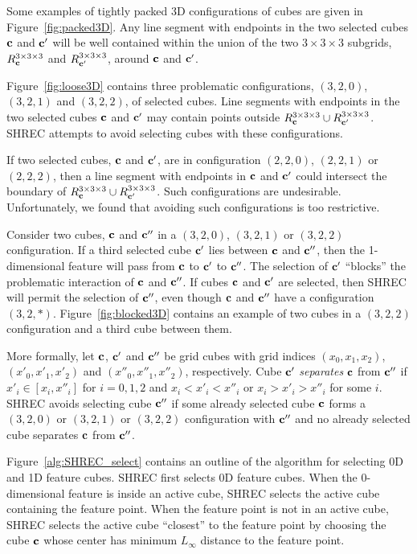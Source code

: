 Some examples of tightly packed 3D configurations of cubes are given
in Figure~\ref{fig:packed3D}.
Any line segment with endpoints in the two selected cubes $\mathbf{c}$ and $\mathbf{c}'$
will be well contained within the union 
of the two $3 \times 3 \times 3$ subgrids, 
$R^{3 \times 3 \times 3}_{\mathbf{c}}$ and $R^{3 \times 3 \times 3}_{\mathbf{c}'}$, around $\mathbf{c}$ and $\mathbf{c}'$.

Figure~\ref{fig:loose3D} contains three problematic configurations,
$(3,2,0)$, $(3,2,1)$ and $(3,2,2)$,
of  selected cubes.
Line segments with endpoints in the two selected cubes $\mathbf{c}$ and $\mathbf{c}'$
may contain points outside $R^{3 \times 3 \times 3}_{\mathbf{c}} \cup R^{3 \times 3 \times 3}_{\mathbf{c}'}$.
SHREC attempts to avoid selecting cubes with these configurations.

If two selected cubes, $\mathbf{c}$ and $\mathbf{c}'$, 
are in configuration $(2,2,0)$, $(2,2,1)$ or $(2,2,2)$,
then a line segment with endpoints in $\mathbf{c}$ and $\mathbf{c}'$
could intersect the boundary of $R^{3 \times 3 \times 3}_{\mathbf{c}} \cup R^{3 \times 3 \times 3}_{\mathbf{c}'}$.
Such configurations are undesirable.
Unfortunately, we found that avoiding such configurations is too restrictive.

Consider two cubes, $\mathbf{c}$ and $\mathbf{c}''$ 
in a $(3,2,0)$, $(3,2,1)$ or $(3,2,2)$ configuration.
If a third selected cube $\mathbf{c}'$ lies between $\mathbf{c}$ and $\mathbf{c}''$,
then the 1-dimensional feature will pass from $\mathbf{c}$ to $\mathbf{c}'$ to $\mathbf{c}''$.
The selection of $\mathbf{c}'$ ``blocks'' the problematic interaction 
of $\mathbf{c}$ and $\mathbf{c}''$.
If cubes $\mathbf{c}$ and $\mathbf{c}'$ are selected,
then SHREC will permit the selection of $\mathbf{c}''$,
even though $\mathbf{c}$ and $\mathbf{c}''$ have a configuration $(3,2,*)$.
Figure~\ref{fig:blocked3D} contains an example of two cubes 
in a $(3,2,2)$ configuration and a third cube between them.

More formally,
let $\mathbf{c}$, $\mathbf{c}'$ and $\mathbf{c}''$ be grid cubes with grid indices
$(x_0,x_1,x_2)$, $(x'_0,x'_1,x'_2)$ and $(x''_0,x''_1,x''_2)$, respectively.
Cube $\mathbf{c}'$ {\em separates} $\mathbf{c}$ from $\mathbf{c}''$
if $x'_i \in [x_i,x''_i]$ for $i = 0,1,2$
and $x_i < x'_i < x''_i$ or $x_i > x'_i > x''_i$ for some $i$.
SHREC avoids selecting cube $\mathbf{c}''$ if some already selected cube $\mathbf{c}$
forms a $(3,2,0)$ or $(3,2,1)$ or $(3,2,2)$ configuration with $\mathbf{c}''$
and no already selected cube separates $\mathbf{c}$ from $\mathbf{c}''$.

Figure~\ref{alg:SHREC_select} contains an outline of the algorithm 
for selecting 0D and 1D feature cubes.
SHREC first selects 0D feature cubes.
When the 0-dimensional feature is inside an active cube,
SHREC selects the active cube containing the feature point.
When the feature point is not in an active cube,
SHREC selects the active cube ``closest'' to the feature point
by choosing the cube $\mathbf{c}$ whose center has minimum $L_\infty$ distance
to the feature point.

